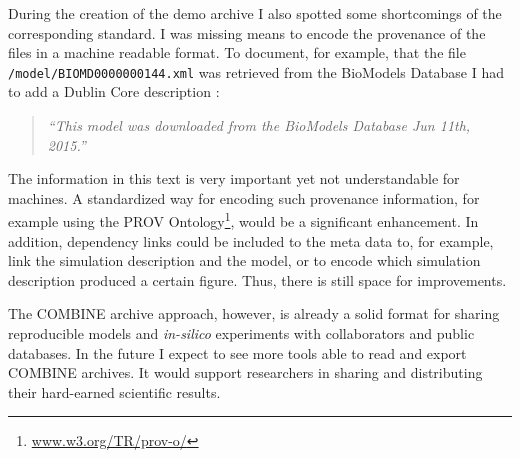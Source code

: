 During the creation of the demo archive I also spotted some shortcomings of the corresponding standard.
I was missing means to encode the provenance of the files in a machine readable format.
To document, for example, that the file \texttt{/model/BIOMD0000000144.xml} was retrieved from the BioModels Database I had to add a Dublin Core description \cite{dc}:
\begin{quote}
\textit{``This model was downloaded from the BioModels Database Jun 11th, 2015.''}
\end{quote}
The information in this text is very important yet not understandable for machines.
A standardized way for encoding such provenance information, for example using the PROV Ontology\footnote{\href{http://www.w3.org/TR/prov-o/}{www.w3.org/TR/prov-o/}}, would be a significant enhancement.
In addition, dependency links could be included to the meta data to, for example, link the simulation description and the model, or to encode which simulation description produced a certain figure.
Thus, there is still space for improvements.

The COMBINE archive approach, however, is already a solid format for sharing reproducible models and \textit{in-silico} experiments with collaborators and public databases.
In the future I expect to see more tools able to read and export COMBINE archives.
It would support researchers in sharing and distributing their hard-earned scientific results.


% 
% 
% 
% 
% 
% 
% 
% 

